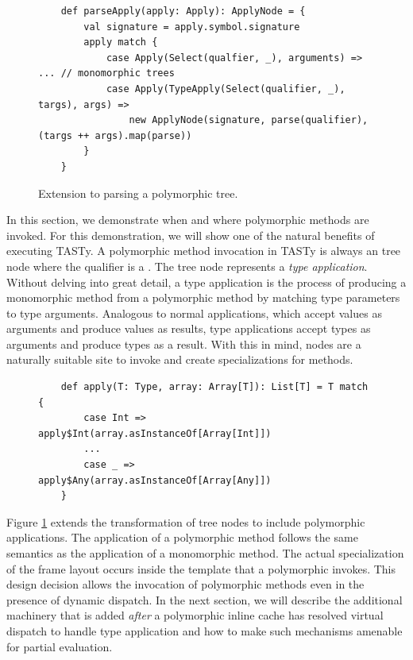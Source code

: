 \begin{figure}[!htb]
	\begin{verbatim}
	def parseApply(apply: Apply): ApplyNode = {
		val signature = apply.symbol.signature
		apply match {
			case Apply(Select(qualfier, _), arguments) => ... // monomorphic trees
			case Apply(TypeApply(Select(qualifier, _), targs), args) =>
				new ApplyNode(signature, parse(qualifier), (targs ++ args).map(parse))
		}
	}
	\end{verbatim}
	\caption{Extension to parsing a polymorphic  tree.}
	\label{impl:parse-typeapply}
\end{figure}

In this section, we demonstrate when and where polymorphic methods are invoked.
For this demonstration, we will show one of the natural benefits of executing TASTy.
A polymorphic method invocation in TASTy is always an  tree node where the qualifier is a .
The  tree node represents a \textit{type application}.
Without delving into great detail, a type application is the process of producing a monomorphic method from a polymorphic method by matching type parameters to type arguments.
Analogous to normal applications, which accept values as arguments and produce values as results, type applications accept types as arguments and produce types as a result.
With this in mind,  nodes are a naturally suitable site to invoke and create specializations for methods.

\begin{figure}[!htb]
	\begin{verbatim}
	def apply(T: Type, array: Array[T]): List[T] = T match {
		case Int => apply$Int(array.asInstanceOf[Array[Int]])
		...
		case _ =>   apply$Any(array.asInstanceOf[Array[Any]])
	}
	\end{verbatim}
\end{figure}

Figure \ref{impl:parse-typeapply} extends the transformation of  tree nodes to include polymorphic applications.
The application of a polymorphic method follows the same semantics as the application of a monomorphic method.
The actual specialization of the frame layout occurs inside the template that a polymorphic  invokes.
This design decision allows the invocation of polymorphic methods even in the presence of dynamic dispatch.
In the next section, we will describe the additional machinery that is added \textit{after} a polymorphic inline cache has resolved virtual dispatch to handle type application and how to make such mechanisms amenable for partial evaluation.

